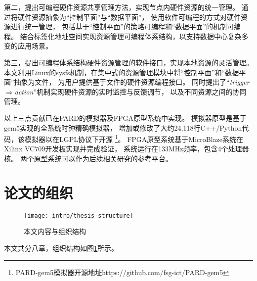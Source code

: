 第二，提出可编程硬件资源共享管理方法，实现节点内硬件资源的统一管理。
通过将硬件资源抽象为``控制平面''与``数据平面''，
使用软件可编程的方式对硬件资源进行统一管理，
包括基于``控制平面''的策略可编程和``数据平面''的机制可编程。
结合标签化地址空间实现资源管理可编程体系结构，以支持数据中心复杂多变的应用场景。


第三，提出可编程体系结构硬件资源管理的软件接口，实现本地资源的灵活管理。
本文利用Linux的sysfs机制，在集中式的资源管理模块中将``控制平面''和``数据平面''抽象为文件，
为用户提供基于文件的硬件资源编程接口。
同时提出了``\emph{trigger$\Rightarrow$action}''机制实现硬件资源的实时监控与反馈调节，
以及不同资源之间的协同管理。


以上三点贡献已在PARD的模拟器及FPGA原型系统中实现。
模拟器原型是基于gem5\cite{binkert_gem5_2011}实现的全系统时钟精确模拟器，
增加或修改了大约24,118行C++/Python代码，该模拟器以在LGPL协议下开源
\footnote{PARD-gem5模拟器开源地址https://github.com/fsg-ict/PARD-gem5}。
FPGA原型系统基于MicroBlaze系统在Xilinx VC709开发板实现并完成验证，
系统运行在133MHz频率，包含4个处理器核。
两个原型系统可以作为后续相关研究的参考平台。


\section{论文的组织}

\begin{figure}[htb]
  \centering
  \texttt{[image: intro/thesis-structure]}
  \caption{本文内容与组织结构}
  \label{fig:thesis-structure}
\end{figure}

本文共分八章，组织结构如图\ref{fig:thesis-structure}所示。

